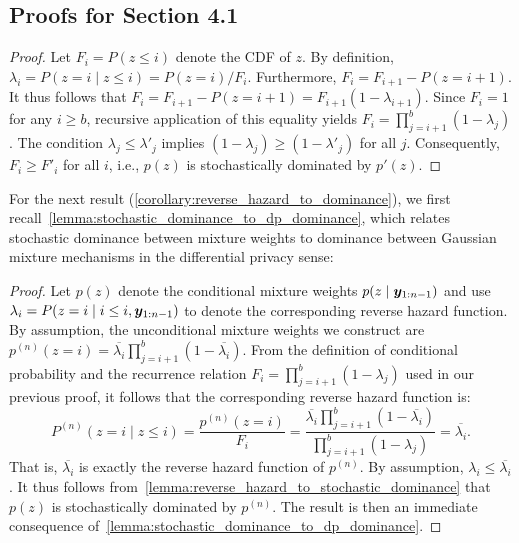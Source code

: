 \subsection{Proofs for Section 4.1}\label{appendix:proofs_cond_comp_algorithm}

\reversehazarddominance*
\begin{proof}
    Let $F_i = P(z \leq i)$ denote the CDF of $z$. By definition, $\lambda_i = P(z=i \mid z \leq i) = P(z=i)/F_i$.
    Furthermore, $F_{i} = F_{i+1} - P(z=i+1)$.
    It thus follows that $F_{i} = F_{i+1} - P(z=i+1) = F_{i+1}(1 - \lambda_{i+1})$. Since $F_i=1$ for any $i \geq b$, recursive application of this equality yields $F_i = \prod_{j=i+1}^b (1 - \lambda_j)$.
    The condition $\lambda_j \leq \lambda'_j$ implies $(1 - \lambda_j) \geq (1 - \lambda'_j)$ for all $j$. Consequently, $F_i \geq F'_i$ for all $i$, i.e., $p(z)$ is stochastically dominated by $p'(z)$.
\end{proof}

For the next result (\cref{corollary:reverse_hazard_to_dominance}), we first recall~\cref{lemma:stochastic_dominance_to_dp_dominance}, which relates stochastic dominance between mixture weights to dominance between Gaussian mixture mechanisms in the differential privacy sense:
\mogweightmonotonicity*

\reversehazardtodominance*
\begin{proof}
    Let $p(z)$ denote the conditional mixture weights $p(z \mid {\bm{y}}_{1:n-1})$ and use $\lambda_i = P(z = i \mid i \leq i, {\bm{y}}_{1:n-1})$ to denote the corresponding reverse hazard function.
    By assumption, the unconditional mixture weights we construct are $p^{(n)}(z = i) = \overline{\lambda_i} \prod_{j=i+1}^b (1 - \overline{\lambda_i})$.
    From the definition of conditional probability and the recurrence relation $F_i = \prod_{j=i+1}^b (1 - \lambda_j)$ used in our previous proof, it follows that the corresponding reverse hazard function is:
    \begin{equation*}
        P^{(n)}(z = i \mid z \leq i) = \frac{p^{(n)}(z = i)}{F_i} =
            \frac{
                \overline{\lambda_i} \prod_{j=i+1}^b (1 - \overline{\lambda_i})
            }{
                \prod_{j=i+1}^b (1 - \lambda_j)
            }
            = \overline{\lambda_i}.
    \end{equation*}
    That is, $\overline{\lambda_i}$ is exactly the reverse hazard function of $p^{(n)}$.
    By assumption, $\lambda_i \leq \overline{\lambda_i}$.
    It thus follows from~\cref{lemma:reverse_hazard_to_stochastic_dominance}
    that $p(z)$ is stochastically dominated by $p^{(n)}$.
    The result is then an immediate consequence of~\cref{lemma:stochastic_dominance_to_dp_dominance}.
\end{proof}

